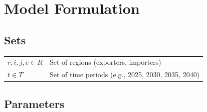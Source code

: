 

\section{Model Formulation}

\subsection{Sets}

\begin{flushleft}
\begin{tabular}{@{}ll@{}}
$r, i, j, e \in R$ & Set of regions (exporters, importers) \\
$t \in T$ & Set of time periods (e.g., 2025, 2030, 2035, 2040) \\
\end{tabular}
\end{flushleft}

\subsection{Parameters}

